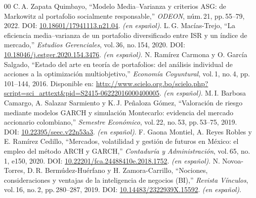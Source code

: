 \documentclass[conference]{IEEEtran}
\begin{document}

\begin{thebibliography}{00}
C.\,A. Zapata Quimbayo, ``Modelo Media--Varianza y criterios ASG: de Markowitz al portafolio socialmente responsable,'' \emph{ODEON}, núm.\,21, pp.\,55--79, 2022. DOI: \href{https://doi.org/10.18601/17941113.n21.04}{10.18601/17941113.n21.04}. \emph{(en español)}.
L.\,G. Macías-Trejo, ``La eficiencia media--varianza de un portafolio diversificado entre ISR y un índice de mercado,'' \emph{Estudios Gerenciales}, vol.\,36, no.\,154, 2020. DOI: \href{https://doi.org/10.18046/j.estger.2020.154.3476}{10.18046/j.estger.2020.154.3476}. \emph{(en español)}.
N. Ramírez Carmona y O. García Salgado, ``Estado del arte en teoría de portafolios: del análisis individual de acciones a la optimización multiobjetivo,'' \emph{Economía Coyuntural}, vol.\,1, no.\,4, pp.\,101--144, 2016. Disponible en: \url{http://www.scielo.org.bo/scielo.php?script=sci_arttext&pid=S2415-06222016000400005}. \emph{(en español)}.
M.\,I. Barbosa Camargo, A. Salazar Sarmiento y K.\,J. Peñaloza Gómez, ``Valoración de riesgo mediante modelos GARCH y simulación Montecarlo: evidencia del mercado accionario colombiano,'' \emph{Semestre Económico}, vol.\,22, no.\,53, pp.\,53--75, 2019. DOI: \href{https://doi.org/10.22395/seec.v22n53a3}{10.22395/seec.v22n53a3}. \emph{(en español)}.
F. Gaona Montiel, A. Reyes Robles y E. Ramírez Cedillo, ``Mercados, volatilidad y gestión de futuros en México: el empleo del método ARCH y GARCH,'' \emph{Contaduría y Administración}, vol.\,65, no.\,1, e150, 2020. DOI: \href{https://doi.org/10.22201/fca.24488410e.2018.1752}{10.22201/fca.24488410e.2018.1752}. \emph{(en español)}.
N. Novoa-Torres, D.\,R. Bermúdez-Huérfano y H. Zamora-Carrillo, ``Nociones, consideraciones y ventajas de la inteligencia de negocios (BI),'' \emph{Revista Vínculos}, vol.\,16, no.\,2, pp.\,280--287, 2019. DOI: \href{https://doi.org/10.14483/2322939X.15592}{10.14483/2322939X.15592}. \emph{(en español)}.
\end{thebibliography}
\end{document}
